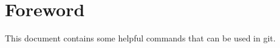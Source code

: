 \section*{Foreword}

This document contains some helpful commands that can be used in git.

\tableofcontents